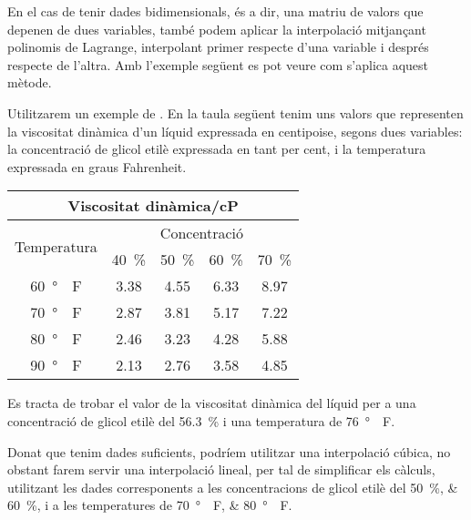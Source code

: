 En el cas de tenir dades bidimensionals, és a dir, una matriu de valors que depenen de dues variables, també podem aplicar la interpolació  mitjançant polinomis de Lagrange, interpolant primer respecte d'una variable i després respecte de l'altra. Amb l'exemple següent es pot veure com s'aplica aquest mètode.

\begin{exemple}
    Utilitzarem un exemple de \cite{EJB}. En la taula següent tenim uns valors que representen la viscositat dinàmica d'un líquid expressada en centipoise, segons dues variables: la concentració de glicol etilè
    expressada en tant per cent, i la temperatura expressada en graus Fahrenheit.

    \begin{center}
       \begin{tabular}{ccccc}
       \multicolumn{5}{c}{Viscositat dinàmica/cP}\\
       \toprule[1pt]
       \multirow{2}{25mm}{\rule{0mm}{4.5mm}Temperatura} & \multicolumn{4}{c}{Concentració}\\
       \cmidrule(rl){2-5}
                            & \SI{40}{\percent} & \SI{50}{\percent} & \SI{60}{\percent} & \SI{70}{\percent} \\
       \cmidrule(lr){1-5}
       \SI{60}{\degree{}F}  & \num{3,38}  & \num{4,55}  & \num{6,33}  & \num{8,97} \\
       \SI{70}{\degree{}F}  & \num{2,87}  & \num{3,81}  & \num{5,17}  & \num{7,22} \\
       \SI{80}{\degree{}F}  & \num{2,46}  & \num{3,23}  & \num{4,28}  & \num{5,88} \\
       \SI{90}{\degree{}F}  & \num{2,13}  & \num{2,76}  & \num{3,58}  & \num{4,85} \\
       \bottomrule[1pt]
       \end{tabular}
    \end{center}

    Es tracta de trobar el valor de la viscositat dinàmica del líquid per a una concentració de glicol etilè
    del \SI{56,3}{\percent} i una temperatura de \SI{76}{\degree{}F}.

    Donat que tenim dades suficients, podríem utilitzar una interpolació cúbica, no obstant farem servir una interpolació lineal, per tal de simplificar els càlculs, utilitzant les dades corresponents  a les concentracions de glicol etilè del  \SIlist{50;60}{\percent}, i a les temperatures de  \SIlist{70;80}{\degree{}F}.


\end{exemple}
